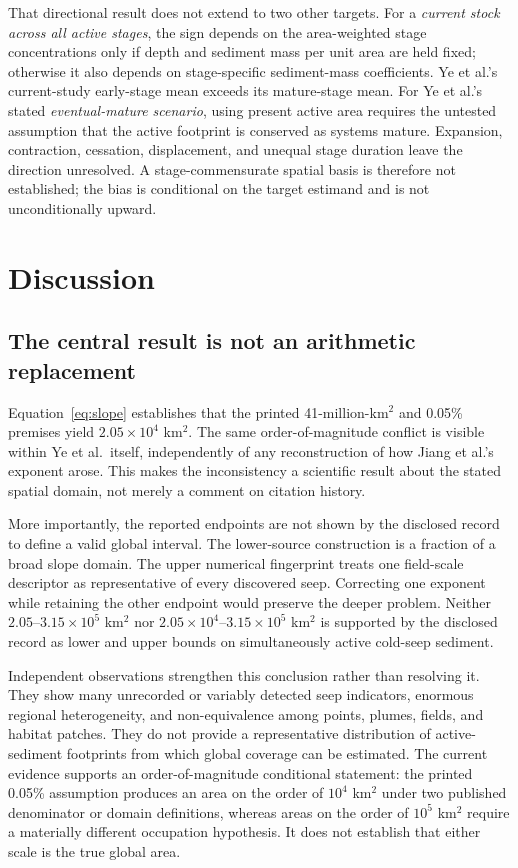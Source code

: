 \documentclass[11pt,letterpaper]{article}
\begin{document}
That directional result does not extend to two other targets. For a \emph{current stock across all active stages}, the sign depends on the area-weighted stage concentrations only if depth and sediment mass per unit area are held fixed; otherwise it also depends on stage-specific sediment-mass coefficients. Ye et al.'s current-study early-stage mean exceeds its mature-stage mean. For Ye et al.'s stated \emph{eventual-mature scenario}, using present active area requires the untested assumption that the active footprint is conserved as systems mature. Expansion, contraction, cessation, displacement, and unequal stage duration leave the direction unresolved. A stage-commensurate spatial basis is therefore not established; the bias is conditional on the target estimand and is not unconditionally upward.

\section{Discussion}

\subsection{The central result is not an arithmetic replacement}

Equation~\eqref{eq:slope} establishes that the printed 41-million-km$^2$ and 0.05\% premises yield $2.05\times10^4$ km$^2$. The same order-of-magnitude conflict is visible within Ye et al.\ itself, independently of any reconstruction of how Jiang et al.'s exponent arose. This makes the inconsistency a scientific result about the stated spatial domain, not merely a comment on citation history.

More importantly, the reported endpoints are not shown by the disclosed record to define a valid global interval. The lower-source construction is a fraction of a broad slope domain. The upper numerical fingerprint treats one field-scale descriptor as representative of every discovered seep. Correcting one exponent while retaining the other endpoint would preserve the deeper problem. Neither $2.05$--$3.15\times10^5$ km$^2$ nor $2.05\times10^4$--$3.15\times10^5$ km$^2$ is supported by the disclosed record as lower and upper bounds on simultaneously active cold-seep sediment.

Independent observations strengthen this conclusion rather than resolving it. They show many unrecorded or variably detected seep indicators, enormous regional heterogeneity, and non-equivalence among points, plumes, fields, and habitat patches. They do not provide a representative distribution of active-sediment footprints from which global coverage can be estimated. The current evidence supports an order-of-magnitude conditional statement: the printed 0.05\% assumption produces an area on the order of $10^4$ km$^2$ under two published denominator or domain definitions, whereas areas on the order of $10^5$ km$^2$ require a materially different occupation hypothesis. It does not establish that either scale is the true global area.
\end{document}

